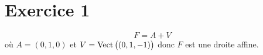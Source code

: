 \part{Exercice 1}

\[
	F = A + V
\] où $A = (0, 1, 0)$ et $V = \operatorname{Vect}\big((0,1,-1)\big)$ donc $F$ est une droite affine.

